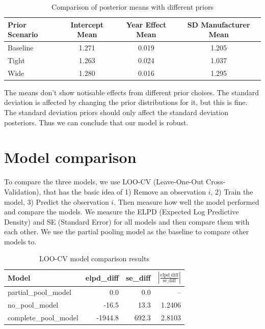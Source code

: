 \documentclass[12pt,a4paper]{article}
\begin{document}
\begin{table}[h]
  \centering
  \caption{Comparison of posterior means with different priors}
  \label{tab:posterior_comparison}
  \begin{tabular}{lccc}
    \hline
    Prior Scenario & Intercept Mean & Year Effect Mean & SD Manufacturer Mean \\
    \hline
    Baseline       & 1.271          & 0.019            & 1.205                \\
    Tight          & 1.263          & 0.024            & 1.037                \\
    Wide           & 1.280          & 0.016            & 1.295                \\
    \hline
  \end{tabular}
\end{table}

The means don't show notisable effects from different prior choises. The standard deviation is affected by changing the prior distributions for it, but this is fine. The standard deviation priors should only affect the standard deviation posteriors. Thus we can conclude that our model is robust.



\section{Model comparison}

To compare the three models, we use LOO-CV (Leave-One-Out Cross-Validation), that has the basic idea of 1) Remove an observation \(i\), 2) Train the model, 3) Predict the observation \(i\). Then measure how well the model performed and compare the models. We measure the ELPD (Expected Log Predictive Density) and SE (Standard Error) for all models and then compare them with each other. We use the partial pooling model as the baseline to compare other models to.

\begin{table}[h]
  \centering
  \begin{tabular}{lrrr}
    \hline
    Model                 & elpd\_diff & se\_diff & $\left|\frac{\text{elpd\_diff}}{\text{se\_diff}}\right|$ \\
    \hline
    partial\_pool\_model  & 0.0        & 0.0      & --                                                       \\
    no\_pool\_model       & -16.5      & 13.3     & 1.2406                                                   \\
    complete\_pool\_model & -1944.8    & 692.3    & 2.8103                                                   \\
    \hline
  \end{tabular}
  \caption{LOO-CV model comparison results}
  \label{tab:model_comparison_ratio}
\end{table}
\end{document}
